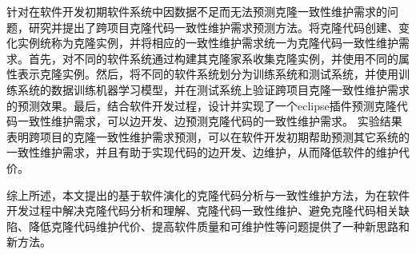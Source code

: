 {针对在软件开发初期软件系统中因数据不足而无法预测克隆一致性维护需求的问题，研究并提出了跨项目克隆代码一致性维护需求预测方法。将克隆代码创建、变化实例统称为克隆实例，并将相应的一致性维护需求统一为克隆代码一致性维护需求。首先，对不同的软件系统通过构建其克隆家系收集克隆实例，并使用不同的属性表示克隆实例。然后，将不同的软件系统划分为训练系统和测试系统，并使用训练系统的数据训练机器学习模型，并在测试系统上验证跨项目克隆一致性维护需求的预测效果。最后，结合软件开发过程，设计并实现了一个eclipse插件预测克隆代码一致性维护需求，可以边开发、边预测克隆代码的一致性维护需求。 实验结果表明跨项目的克隆一致性维护需求预测，可以在软件开发初期帮助预测其它系统的一致性维护需求，并且有助于实现代码的边开发、边维护，从而降低软件的维护代价。

综上所述，本文提出的基于软件演化的克隆代码分析与一致性维护方法，为在软件开发过程中解决克隆代码分析和理解、克隆代码一致性维护、避免克隆代码相关缺陷、降低克隆代码维护代价、提高软件质量和可维护性等问题提供了一种新思路和新方法。
}


